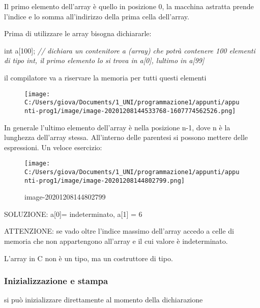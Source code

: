 \documentclass[
]{article}
\newenvironment{Shaded}{}{}
\newcommand{\CommentTok}[1]{\textcolor[rgb]{0.38,0.63,0.69}{\textit{#1}}}
\newcommand{\DataTypeTok}[1]{\textcolor[rgb]{0.56,0.13,0.00}{#1}}
\newcommand{\DecValTok}[1]{\textcolor[rgb]{0.25,0.63,0.44}{#1}}
\newcommand{\NormalTok}[1]{#1}
\begin{document}
Il primo elemento dell'array è quello in posizione 0, la macchina
astratta prende l'indice e lo somma all'indirizzo della prima cella
dell'array.

Prima di utilizzare le array bisogna dichiararle:

\begin{Shaded}
\begin{Highlighting}[]
\DataTypeTok{int}\NormalTok{ a[}\DecValTok{100}\NormalTok{]; }\CommentTok{// dichiara un contenitore a (array) che potrà contenere 100 elementi di tipo int, il primo elemento lo si trova in a[0], l\textquotesingle{}ultimo in a[99]}
\end{Highlighting}
\end{Shaded}

il compilatore va a riservare la memoria per tutti questi elementi

\begin{figure}
\centering
\texttt{[image: C:/Users/giova/Documents/1\_UNI/programmazione1/appunti/appunti-prog1/image/image-20201208144533768-1607774562526.png]}
\caption{}
\end{figure}

In generale l'ultimo elemento dell'array è nella posizione n-1, dove n è
la lunghezza dell'array stessa. All'interno delle parentesi si possono
mettere delle espressioni. Un veloce esercizio:

\begin{figure}
\centering
\texttt{[image: C:/Users/giova/Documents/1\_UNI/programmazione1/appunti/appunti-prog1/image/image-20201208144802799.png]}
\caption{image-20201208144802799}
\end{figure}

SOLUZIONE: a{[}0{]}= indeterminato, a{[}1{]} = 6

ATTENZIONE: se vado oltre l'indice massimo dell'array accedo a celle di
memoria che non appartengono all'array e il cui valore è indeterminato.

L'array in C non è un tipo, ma un costruttore di tipo.

\hypertarget{header-n442}{%
\subsubsection{Inizializzazione e stampa}\label{header-n442}}

si può inizializzare direttamente al momento della dichiarazione
\end{document}
